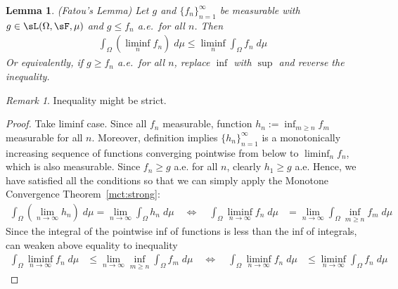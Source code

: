 \documentclass[12pt]{article}
\theoremstyle{plain}
\newtheorem{lem}[thm]{Lemma}
\theoremstyle{definition}
\theoremstyle{remark}
\newtheorem*{rmk}{Remark}
\newcommand{\ninf}{_{n=1}^\infty}
\begin{document}
\begin{lem}\emph{(Fatou's Lemma)}
Let $g$ and $\{f_n\}\ninf$ be measurable with $g\in\sL(\Omega,\sF,\mu)$
and $g \leq f_n$ a.e.\ for all $n$. Then
\begin{align*}
  \int_\Omega \left(\liminf_n f_n\right) \; d\mu
  \leq \liminf_n \int_\Omega f_n \; d\mu
\end{align*}
Or equivalently, if $g \geq f_n$ a.e.\ for all $n$, replace $\inf$ with
$\sup$ and reverse the inequality.
\end{lem}
\begin{rmk}
Inequality might be strict.
\end{rmk}
\begin{proof}
Take liminf case.
Since all $f_n$ measurable, function $h_n := \inf_{m\geq n} f_m$
measurable for all $n$. Moreover, definition implies $\{h_n\}\ninf$ is a
monotonically increasing sequence of functions converging pointwise from
below to $\liminf_n f_n$, which is also measurable.
Since $f_n\geq g$ a.e. for all $n$, clearly $h_1\geq g$ a.e.
Hence, we have satisfied all the conditions so that we can simply apply
the Monotone Convergence Theorem~\ref{mct:strong}:
\begin{align*}
    \int_\Omega \left(\lim_{n\rightarrow\infty} h_n\right) \; d\mu
    = \lim_{n\rightarrow\infty} \int_\Omega h_n \; d\mu
    \quad\iff\quad
    \int_\Omega \liminf_{n\rightarrow\infty} f_n \; d\mu
    &= \lim_{n\rightarrow\infty} \int_\Omega \inf_{m\geq n} f_m \; d\mu
\end{align*}
Since the integral of the pointwise inf of functions is less than the
inf of integrals, can weaken above equality to inequality
\begin{align*}
    \int_\Omega \liminf_{n\rightarrow\infty} f_n \; d\mu
    &\leq \lim_{n\rightarrow\infty} \inf_{m\geq n} \int_\Omega f_m \; d\mu
    \quad\iff\quad
    \int_\Omega \liminf_{n\rightarrow\infty} f_n \; d\mu
    &\leq \liminf_{n\rightarrow\infty}\int_\Omega f_n \; d\mu
\end{align*}
\end{proof}
\end{document}
